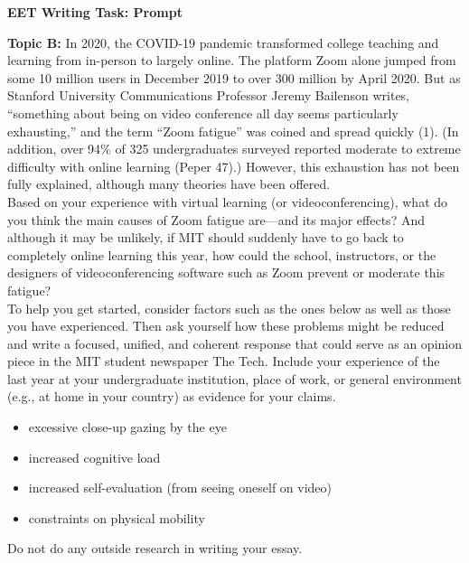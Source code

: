 \documentclass[12pt]{article}
\begin{document}
\begin{center}
	\textbf{EET Writing Task: Prompt}
\end{center}

\begin{framed}
	\noindent \textbf{Topic B:}  In 2020, the COVID-19 pandemic transformed college teaching and learning from in-person to largely online. The platform Zoom alone jumped from some 10 million users in December 2019 to over 300 million by April 2020. But as Stanford University Communications Professor Jeremy Bailenson writes, ``something about being on video conference all day seems particularly exhausting,'' and the term ``Zoom fatigue'' was coined and spread quickly (1). (In addition, over 94\% of 325 undergraduates surveyed reported moderate to extreme difficulty with online learning (Peper 47).) However, this exhaustion has not been fully explained, although many theories have been offered.\\
	
	
	
	\noindent Based on your experience with virtual learning (or videoconferencing), what do you think the main causes of Zoom fatigue are—and its major effects? And although it may be unlikely, if MIT should suddenly have to go back to completely online learning this year, how could the school, instructors, or the designers of videoconferencing software such as Zoom prevent or moderate this fatigue?\\
	
	
	
	\noindent To help you get started, consider factors such as the ones below as well as those you have experienced. Then ask yourself how these problems might be reduced and write a focused, unified, and coherent response that could serve as an opinion piece in the MIT student newspaper The Tech. Include your experience of the last year at your undergraduate institution, place of work, or general environment (e.g., at home in your country) as evidence for your claims.
	
	\begin{itemize}
		\item excessive close-up gazing by the eye
		\item increased cognitive load
		\item increased self-evaluation (from seeing oneself on video)
		\item constraints on physical mobility
	\end{itemize}
	
	\noindent Do not do any outside research in writing your essay.
\end{framed}
\end{document}
